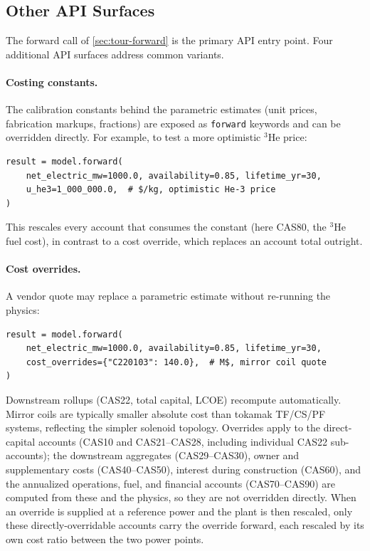 \documentclass{article}
\begin{document}
\subsection{Other API Surfaces}
\label{sec:tour-api}

The forward call of \cref{sec:tour-forward} is the primary API entry
point. Four additional API surfaces address common variants.

\paragraph{Costing constants.} The calibration constants behind the
parametric estimates (unit prices, fabrication markups, fractions) are
exposed as \texttt{forward} keywords and can be overridden directly. For
example, to test a more optimistic ${}^3$He price:

\begin{minipage}{\linewidth}
\begin{lstlisting}
result = model.forward(
    net_electric_mw=1000.0, availability=0.85, lifetime_yr=30,
    u_he3=1_000_000.0,  # $/kg, optimistic He-3 price
)
\end{lstlisting}
\end{minipage}

This rescales every account that consumes the constant (here CAS80, the
${}^3$He fuel cost), in contrast to a cost override, which replaces an
account total outright.

\paragraph{Cost overrides.} A vendor quote may replace a parametric
estimate without re-running the physics:

\begin{minipage}{\linewidth}
\begin{lstlisting}
result = model.forward(
    net_electric_mw=1000.0, availability=0.85, lifetime_yr=30,
    cost_overrides={"C220103": 140.0},  # M$, mirror coil quote
)
\end{lstlisting}
\end{minipage}

Downstream rollups (CAS22, total capital, LCOE) recompute
automatically. Mirror coils are typically smaller absolute cost than
tokamak TF/CS/PF systems, reflecting the simpler solenoid topology.
Overrides apply to the direct-capital accounts (CAS10 and CAS21--CAS28,
including individual CAS22 sub-accounts); the downstream aggregates
(CAS29--CAS30), owner and supplementary costs (CAS40--CAS50), interest
during construction (CAS60), and the annualized operations, fuel, and
financial accounts (CAS70--CAS90) are computed from these and the
physics, so they are not overridden directly. When an override is
supplied at a reference power and the plant is then rescaled, only
these directly-overridable accounts carry the override forward, each
rescaled by its own cost ratio between the two power points.
\end{document}
